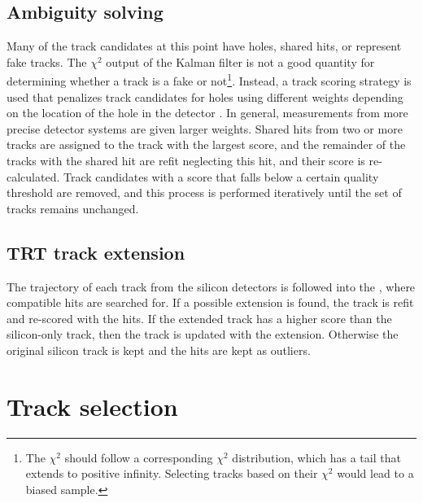 \subsection{Ambiguity solving} %

Many of the track candidates at this point have holes, shared hits, or represent fake tracks.
The $\chi^2$ output of the Kalman filter is not a good quantity for determining whether a track is a fake or not\footnote{The $\chi^2$ should follow a corresponding $\chi^2$ distribution, which has a tail that extends to positive infinity. Selecting tracks based on their $\chi^2$ would lead to a biased sample.}.
Instead, a track scoring strategy is used that penalizes track candidates for holes using different weights depending on the location of the hole in the detector \cite{Wicke:1998efw}.
In general, measurements from more precise detector systems are given larger weights.
Shared hits from two or more tracks are assigned to the track with the largest score, and the remainder of the tracks with the shared hit are refit neglecting this hit, and their score is re-calculated.
Track candidates with a score that falls below a certain quality threshold are removed, and this process is performed iteratively until the set of tracks remains unchanged.

\subsection{TRT track extension}

The trajectory of each track from the silicon detectors is followed into the \trt, where compatible hits are searched for.
If a possible extension is found, the track is refit and re-scored with the \trt hits.
If the extended track has a higher score than the silicon-only track, then the track is updated with the extension.
Otherwise the original silicon track is kept and the \trt hits are kept as outliers.

\section{Track selection} %

